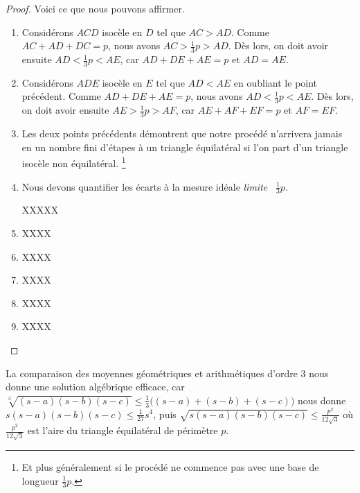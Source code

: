 \begin{proof}
	
	Voici ce que nous pouvons affirmer.
	\begin{enumerate}
		\item Considérons $ACD$ isocèle en $D$ tel que $AC > AD$.
		Comme $AC + AD + DC = p$, nous avons $AC > \frac13p > AD$.
		Dès lors, on doit avoir ensuite  $AD < \frac13p < AE$, car $AD + DE + AE = p$ et $AD = AE$.


		\item Considérons $ADE$ isocèle en $E$ tel que $AD < AE$ en oubliant le point précédent.
		Comme $AD + DE + AE = p$, nous avons $AD < \frac13p < AE$.
		Dès lors, on doit avoir ensuite  $AE > \frac13p > AF$, car $AE + AF + EF = p$ et $AF = EF$.


		\item Les deux points précédents démontrent que notre procédé n'arrivera jamais en un nombre fini d'étapes à un triangle équilatéral si l'on part d'un triangle isocèle non équilatéral.%
		\footnote{
			Et plus généralement si le procédé ne commence pas avec une base de longueur $\frac13 p$.
		}


		\item Nous devons quantifier les écarts à la mesure idéale \og \emph{limite} \fg\ $\frac13 p$.
		
		XXXXX


		\item XXXX


		\item XXXX


		\item XXXX


		\item XXXX


		\item XXXX
	\end{enumerate}


\end{proof}




\begin{remark}
	La comparaison des moyennes géométriques et arithmétiques d'ordre $3$ nous donne une solution algébrique efficace, car 
	$\sqrt[3]{(s - a)(s - b)(s - c)} \leq \frac13 \big( (s - a) + (s - b) + (s - c) \big)$
	nous donne
	$s(s - a)(s - b)(s - c) \leq \frac{1}{27} s^4$,
	puis
	$\sqrt{s(s - a)(s - b)(s - c)} \leq \frac{p^2}{12 \sqrt{3}}$
	où $\frac{p^2}{12 \sqrt{3}}$ est l'aire du triangle équilatéral de périmètre $p$.
\end{remark}
